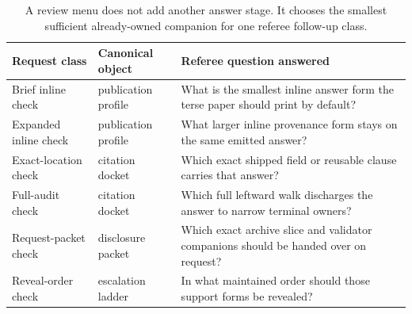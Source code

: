 \documentclass[11pt]{article}
\begin{document}
\begin{table}[t]
\centering
\small
\begin{tabularx}{\linewidth}{@{}l l X@{}}
\toprule
Request class & Canonical object & Referee question answered \\
\midrule
Brief inline check & publication profile & What is the smallest inline answer form the terse paper should print by default? \\
Expanded inline check & publication profile & What larger inline provenance form stays on the same emitted answer? \\
Exact-location check & citation docket & Which exact shipped field or reusable clause carries that answer? \\
Full-audit check & citation docket & Which full leftward walk discharges the answer to narrow terminal owners? \\
Request-packet check & disclosure packet & Which exact archive slice and validator companions should be handed over on request? \\
Reveal-order check & escalation ladder & In what maintained order should those support forms be revealed? \\
\bottomrule
\end{tabularx}
\caption{A review menu does not add another answer stage. It chooses the smallest sufficient already-owned companion for one referee follow-up class.}
\label{tab:answerreviewmenu}
\end{table}
\end{document}
